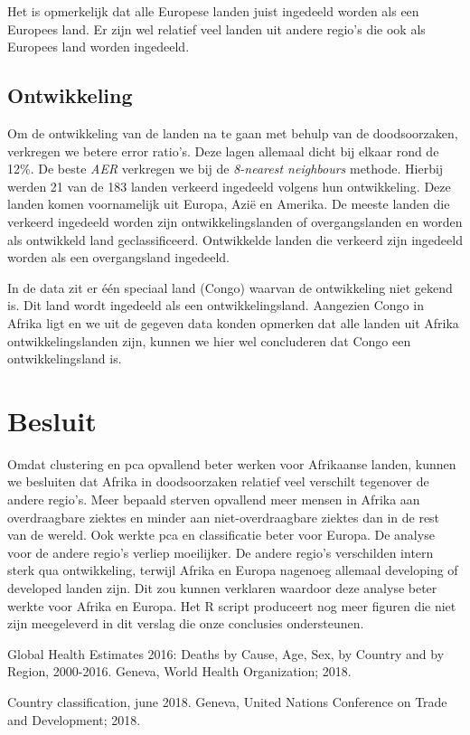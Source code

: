 \documentclass[a4paper,kulak]{kulakarticle}
\begin{document}
Het is opmerkelijk dat alle Europese landen juist ingedeeld worden als een Europees land. Er zijn wel relatief veel landen uit andere regio's die ook als Europees land worden ingedeeld. 

\subsection{Ontwikkeling}
Om de ontwikkeling van de landen na te gaan met behulp van de doodsoorzaken, verkregen we betere error ratio's. Deze lagen allemaal dicht bij elkaar rond de 12\%. De beste \textit{AER} verkregen we bij de \textit{8-nearest neighbours} methode. Hierbij werden 21 van de 183 landen verkeerd ingedeeld volgens hun ontwikkeling. Deze landen komen voornamelijk uit Europa, Azi\"e en Amerika. De meeste landen die verkeerd ingedeeld worden zijn ontwikkelingslanden of overgangslanden en worden als ontwikkeld land geclassificeerd. Ontwikkelde landen die verkeerd zijn ingedeeld worden als een overgangsland ingedeeld. 

In de data zit er \'e\'en speciaal land (Congo) waarvan de ontwikkeling niet gekend is. Dit land wordt ingedeeld als een ontwikkelingsland. Aangezien Congo in Afrika ligt en we uit de gegeven data konden opmerken dat alle landen uit Afrika ontwikkelingslanden zijn, kunnen we hier wel concluderen dat Congo een ontwikkelingsland is. 

\section*{Besluit}

Omdat clustering en pca opvallend beter werken voor Afrikaanse landen, kunnen we besluiten dat Afrika in doodsoorzaken relatief veel verschilt tegenover de andere regio's.
Meer bepaald sterven opvallend meer mensen in Afrika aan overdraagbare ziektes en minder aan niet-overdraagbare ziektes dan in de rest van de wereld. 
Ook werkte pca en classificatie beter voor Europa.
De analyse voor de andere regio's verliep moeilijker.
De andere regio's verschilden intern sterk qua ontwikkeling, terwijl Afrika en Europa nagenoeg allemaal developing of developed landen zijn.
Dit zou kunnen verklaren waardoor deze analyse beter werkte voor Afrika en Europa.
Het R script produceert nog meer figuren die niet zijn meegeleverd in dit verslag die onze conclusies ondersteunen.

\begin{thebibliography}{9}
	
	Global Health Estimates 2016: Deaths by Cause, Age, Sex, by Country and by Region, 2000-2016.
	Geneva, World Health Organization; 2018.
	
	Country classification, june 2018. Geneva, United Nations Conference on Trade and Development;
	2018.
	
\end{thebibliography}
\end{document}
